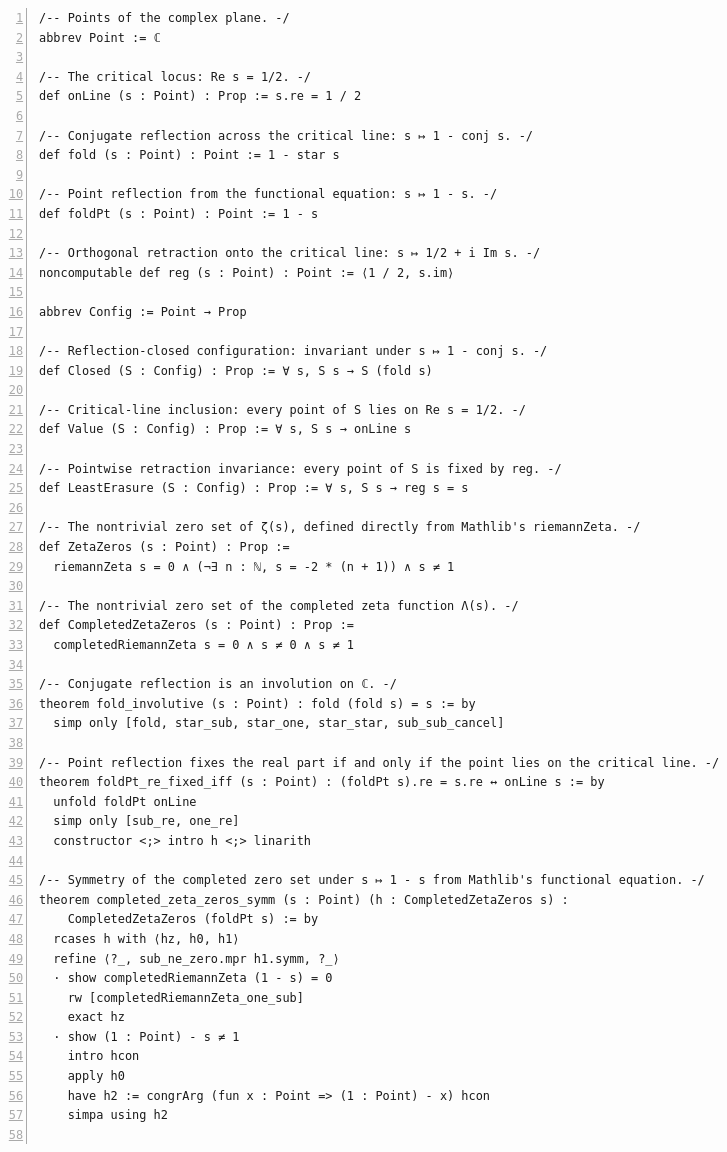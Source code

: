 \documentclass[10pt]{article}
\newcommand{\leansize}{\fontsize{5.5pt}{6.75pt}\selectfont}
\begin{document}
\begin{multicols}{2}
\begin{Verbatim}[numbers=left,firstnumber=1,numbersep=3pt,xleftmargin=2.6em,breaklines=true,breakanywhere=true,breakautoindent=false,breakindent=1.4em,breaksymbolleft={},breakanywheresymbolpre={},fontsize=\leansize]
/-- Points of the complex plane. -/
abbrev Point := ℂ

/-- The critical locus: Re s = 1/2. -/
def onLine (s : Point) : Prop := s.re = 1 / 2

/-- Conjugate reflection across the critical line: s ↦ 1 - conj s. -/
def fold (s : Point) : Point := 1 - star s

/-- Point reflection from the functional equation: s ↦ 1 - s. -/
def foldPt (s : Point) : Point := 1 - s

/-- Orthogonal retraction onto the critical line: s ↦ 1/2 + i Im s. -/
noncomputable def reg (s : Point) : Point := ⟨1 / 2, s.im⟩

abbrev Config := Point → Prop

/-- Reflection-closed configuration: invariant under s ↦ 1 - conj s. -/
def Closed (S : Config) : Prop := ∀ s, S s → S (fold s)

/-- Critical-line inclusion: every point of S lies on Re s = 1/2. -/
def Value (S : Config) : Prop := ∀ s, S s → onLine s

/-- Pointwise retraction invariance: every point of S is fixed by reg. -/
def LeastErasure (S : Config) : Prop := ∀ s, S s → reg s = s

/-- The nontrivial zero set of ζ(s), defined directly from Mathlib's riemannZeta. -/
def ZetaZeros (s : Point) : Prop :=
  riemannZeta s = 0 ∧ (¬∃ n : ℕ, s = -2 * (n + 1)) ∧ s ≠ 1

/-- The nontrivial zero set of the completed zeta function Λ(s). -/
def CompletedZetaZeros (s : Point) : Prop :=
  completedRiemannZeta s = 0 ∧ s ≠ 0 ∧ s ≠ 1

/-- Conjugate reflection is an involution on ℂ. -/
theorem fold_involutive (s : Point) : fold (fold s) = s := by
  simp only [fold, star_sub, star_one, star_star, sub_sub_cancel]

/-- Point reflection fixes the real part if and only if the point lies on the critical line. -/
theorem foldPt_re_fixed_iff (s : Point) : (foldPt s).re = s.re ↔ onLine s := by
  unfold foldPt onLine
  simp only [sub_re, one_re]
  constructor <;> intro h <;> linarith

/-- Symmetry of the completed zero set under s ↦ 1 - s from Mathlib's functional equation. -/
theorem completed_zeta_zeros_symm (s : Point) (h : CompletedZetaZeros s) :
    CompletedZetaZeros (foldPt s) := by
  rcases h with ⟨hz, h0, h1⟩
  refine ⟨?_, sub_ne_zero.mpr h1.symm, ?_⟩
  · show completedRiemannZeta (1 - s) = 0
    rw [completedRiemannZeta_one_sub]
    exact hz
  · show (1 : Point) - s ≠ 1
    intro hcon
    apply h0
    have h2 := congrArg (fun x : Point => (1 : Point) - x) hcon
    simpa using h2


\end{Verbatim}
\end{multicols}
\end{document}
